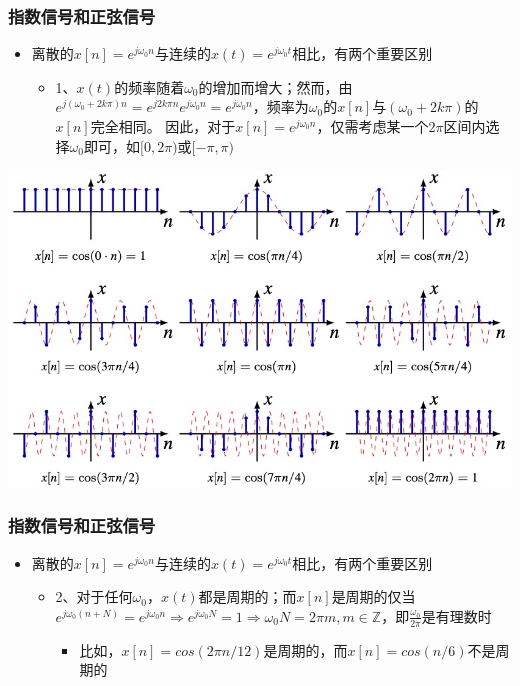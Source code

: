 \documentclass[CJKutf8,xcolor=pdftex,dvipsnames,table]{beamer}
\begin{document}
\begin{CJK*}{UTF8}{song}
  \begin{frame}
    \frametitle{指数信号和正弦信号}
    \begin{itemize}
    \item 离散的$x[n]=e^{j\omega_0 n}$与连续的$x(t)=e^{j\omega_{0}t}$相比，有两个重要区别
        \begin{itemize}
        \item 1、$x(t)$的频率随着$\omega_0$的增加而增大；然而，由$e^{j(\omega_0 + 2k\pi)n}=e^{j2k\pi n}e^{j\omega_0 n}=e^{j\omega_0 n}$，频率为$\omega_0$的$x[n]$与$(\omega_0 +2k\pi)$的$x[n]$完全相同。
        因此，对于$x[n]=e^{j\omega_0 n}$，仅需考虑某一个$2\pi$区间内选择$\omega_0$即可，如$[0, 2\pi)$或$[-\pi, \pi)$
        \end{itemize}    
    \end{itemize}
    \begin{center}
      \includegraphics[scale=.3]{dsinusoidp1}
    \end{center}  
  \end{frame} 

  \begin{frame}
    \frametitle{指数信号和正弦信号}
    \begin{itemize}
    \item 离散的$x[n]=e^{j\omega_0 n}$与连续的$x(t)=e^{j\omega_{0}t}$相比，有两个重要区别
        \begin{itemize}
        \item 2、对于任何$\omega_0$，$x(t)$都是周期的；而$x[n]$是周期的仅当$e^{j\omega_0 (n + N)}=e^{j\omega_0 n} \Rightarrow e^{j\omega_0 N}=1 \Rightarrow \omega_0 N=2\pi m, m \in \mathbb{Z}$，即$\frac{\omega_0}{2\pi}$是有理数时
		\begin{itemize}
		\item 比如，$x[n]=cos(2\pi n /12)$是周期的，而$x[n]=cos(n/6)$不是周期的
		\end{itemize}
        \end{itemize}    
    \end{itemize}
  \end{frame} 
    

\end{CJK*}
\end{document}
